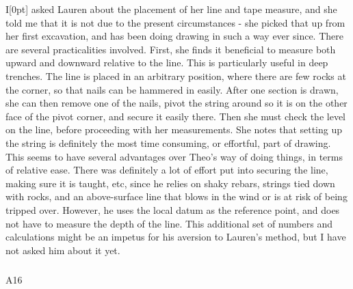 \documentclass[
]{article}
\makeatletter
\let\oldsubparagraph\subparagraph
\renewcommand{\subparagraph}{
    \@ifstar
      \xxxSubParagraphStar
      \xxxSubParagraphNoStar
  }
\newcommand{\xxxSubParagraphStar}[1]{\oldsubparagraph*{#1}\mbox{}}
\newcommand{\xxxSubParagraphNoStar}[1]{\oldsubparagraph{#1}\mbox{}}
\newcommand{\paragraphnumber}[1]{\marginnote{\color{lightgray}\tiny{#1}}[0pt]}
\makeatother
\begin{document}
I\paragraphnumber{[109]} asked Lauren about the placement of her line
and tape measure, and she told me that it is not due to the present
circumstances - she picked that up from her first excavation, and has
been doing drawing in such a way ever since. There are several
practicalities involved. First, she finds it beneficial to measure both
upward and downward relative to the line. This is particularly useful in
deep trenches. The line is placed in an arbitrary position, where there
are few rocks at the corner, so that nails can be hammered in easily.
After one section is drawn, she can then remove one of the nails, pivot
the string around so it is on the other face of the pivot corner, and
secure it easily there. Then she must check the level on the line,
before proceeding with her measurements. She notes that setting up the
string is definitely the most time consuming, or effortful, part of
drawing.\\
This seems to have several advantages over Theo's way of doing things,
in terms of relative ease. There was definitely a lot of effort put into
securing the line, making sure it is taught, etc, since he relies on
shaky rebars, strings tied down with rocks, and an above-surface line
that blows in the wind or is at risk of being tripped over. However, he
uses the local datum as the reference point, and does not have to
measure the depth of the line. This additional set of numbers and
calculations might be an impetus for his aversion to Lauren's method,
but I have not asked him about it yet.

\subparagraph{A16}\label{sec-A16}
\end{document}
